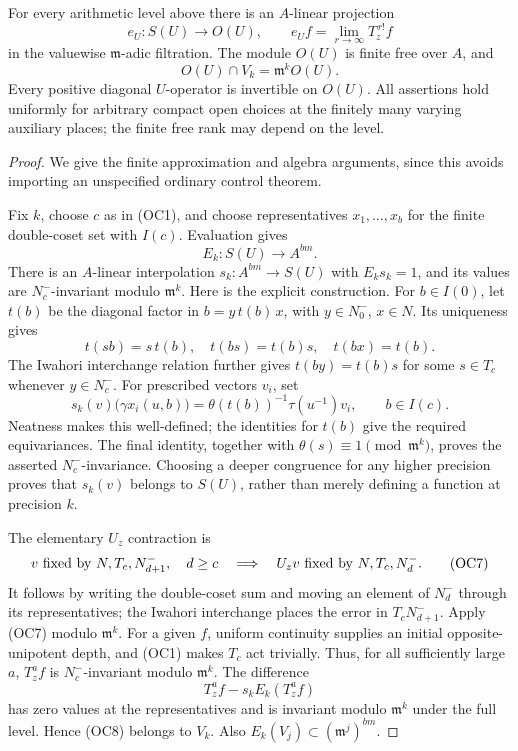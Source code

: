 \begin{srlemma}
\label{lem:ordinary-projector-free}
For every arithmetic level above there is an \(A\)-linear projection
\[
 e_U:S(U)\longrightarrow O(U),\qquad
 e_U f=\lim_{r\to\infty}T_z^{\,r!}f
 \tag{OC4}
\]
in the valuewise \(\mathfrak m\)-adic filtration.  The module \(O(U)\)
is finite free over \(A\), and
\[
 O(U)\cap V_k=\mathfrak m^kO(U).
 \tag{OC5}
\]
Every positive diagonal \(U\)-operator is invertible on \(O(U)\).
All assertions hold uniformly for arbitrary compact open choices at
the finitely many varying auxiliary places; the finite free rank may
depend on the level.
\end{srlemma}

\begin{proof}
We give the finite approximation and algebra arguments, since this
avoids importing an unspecified ordinary control theorem.

Fix \(k\), choose \(c\) as in (OC1), and choose representatives
\(x_1,\ldots,x_b\) for the finite double-coset set with \(I(c)\).
Evaluation gives
\[
 E_k:S(U)\longrightarrow A^{bm}.
\]
There is an \(A\)-linear interpolation
\(s_k:A^{bm}\to S(U)\) with \(E_ks_k=1\), and its values are
\(N^-_c\)-invariant modulo \(\mathfrak m^k\).
Here is the explicit construction.  For \(b\in I(0)\), let \(t(b)\)
be the diagonal factor in \(b=y\,t(b)\,x\), with
\(y\in N^-_0\), \(x\in N\).  Its uniqueness gives
\[
 t(sb)=s\,t(b),\quad t(bs)=t(b)s,\quad t(bx)=t(b).
\]
The Iwahori interchange relation further gives
\(t(by)=t(b)s\) for some \(s\in T_c\) whenever \(y\in N^-_c\).
For prescribed vectors \(v_i\), set
\[
 s_k(v)\bigl(\gamma x_i(u,b)\bigr)
       =\theta(t(b))^{-1}\tau(u^{-1})v_i,
       \qquad b\in I(c).
 \tag{OC6}
\]
Neatness makes this well-defined; the identities for \(t(b)\) give
the required equivariances.  The final identity, together with
\(\theta(s)\equiv1\pmod{\mathfrak m^k}\), proves the asserted
\(N^-_c\)-invariance.  Choosing a deeper congruence for any higher
precision proves that \(s_k(v)\) belongs to \(S(U)\), rather than
merely defining a function at precision \(k\).

The elementary \(U_z\) contraction is
\[
 \begin{split}
 v\ \hbox{fixed by }N,T_c,N^-_{d+1},\quad d\geq c
 \quad\Longrightarrow\quad
 U_zv\ \hbox{fixed by }N,T_c,N^-_d .
 \end{split}
 \tag{OC7}
\]
It follows by writing the double-coset sum and moving an element of
\(N^-_d\) through its representatives; the Iwahori interchange places
the error in \(T_cN^-_{d+1}\).
Apply (OC7) modulo \(\mathfrak m^k\).  For a given \(f\), uniform
continuity supplies an initial opposite-unipotent depth, and (OC1)
makes \(T_c\) act trivially.  Thus, for all sufficiently large \(a\),
\(T_z^af\) is \(N^-_c\)-invariant modulo \(\mathfrak m^k\).
The difference
\[
 T_z^af-s_kE_k(T_z^af)
 \tag{OC8}
\]
has zero values at the representatives and is invariant modulo
\(\mathfrak m^k\) under the full level.  Hence (OC8) belongs to \(V_k\).
Also \(E_k(V_j)\subset(\mathfrak m^j)^{bm}\).


\end{proof}

